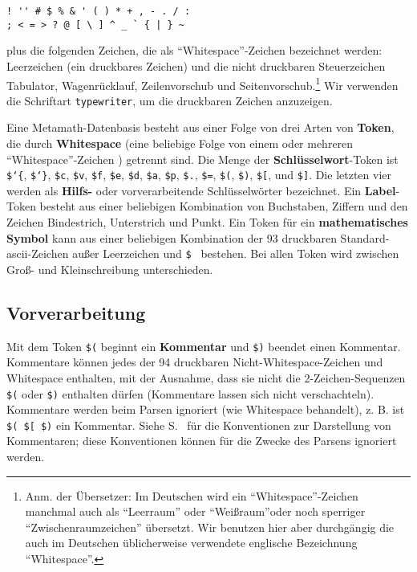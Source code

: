 \begin{verbatim}
! '' # $ % & ' ( ) * + , - . / :
; < = > ? @ [ \ ] ^ _ ` { | } ~
\end{verbatim}
plus die folgenden Zeichen, die als "`Whitespace"'-Zeichen\label{whitespace} bezeichnet werden: Leerzeichen (ein druckbares Zeichen) und die nicht druckbaren Steuerzeichen Tabulator, Wagenrücklauf, Zeilenvorschub und Seitenvorschub.\footnote{Anm. der Übersetzer: Im Deutschen wird ein "`Whitespace"'-Zeichen manchmal auch als "`Leerraum"' oder "`Weißraum"'oder noch sperriger "`Zwischenraumzeichen"' übersetzt. Wir benutzen hier aber durchgängig die auch im Deutschen üblicherweise verwendete englische Bezeichnung "`Whitespace"'.} Wir verwenden die Schriftart \texttt{typewriter}, um die druckbaren Zeichen anzuzeigen.

Eine Metamath-Datenbasis besteht aus einer Folge von drei Arten von {\bf Token}, die durch {\bf Whitespace} (eine beliebige Folge von einem oder mehreren "`Whitespace"'-Zeichen ) getrennt sind.  Die Menge der {\bf Schlüsselwort}-Token ist \texttt{\$\char`\{}, \texttt{\$\char`\}}, \texttt{\$c}, \texttt{\$v}, \texttt{\$f}, \texttt{\$e}, \texttt{\$d}, \texttt{\$a}, \texttt{\$p}, \texttt{\$.}, \texttt{\$=}, \texttt{\$(}, \texttt{\$)}, \texttt{\$[}, und \texttt{\$]}. Die letzten vier werden als {\bf Hilfs-} oder vorverarbeitende Schlüsselwörter bezeichnet.  Ein {\bf Label}-Token besteht aus einer beliebigen Kombination von Buchstaben, Ziffern und den Zeichen Bindestrich, Unterstrich und Punkt.  Ein Token für ein {\bf mathematisches Symbol} kann aus einer beliebigen Kombination der 93 druckbaren Standard-{\sc ascii}-Zeichen außer Leerzeichen und \texttt{\$}~ bestehen. Bei allen Token wird zwischen Groß- und Kleinschreibung unterschieden.

\subsection{Vorverarbeitung}

Mit dem Token \texttt{\$(} beginnt ein {\bf Kommentar} und \texttt{\$)} beendet einen Kommentar. Kommentare können jedes der 94 druckbaren Nicht-Whitespace-Zeichen und Whitespace enthalten, mit der Ausnahme, dass sie nicht die 2-Zeichen-Sequenzen \texttt{\$(} oder \texttt{\$)} enthalten dürfen (Kommentare lassen sich nicht verschachteln). Kommentare werden beim Parsen ignoriert (wie Whitespace behandelt), z. B. ist \texttt{\$( \$[ \$)} ein Kommentar. Siehe S.~\pageref{mathcomments} für die Konventionen zur Darstellung von Kommentaren; diese Konventionen können für die Zwecke des Parsens ignoriert werden.

